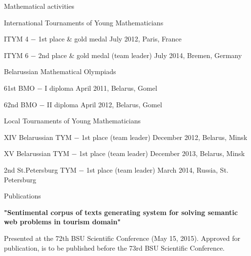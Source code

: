 \documentclass{resume} %
\begin{document}

\begin{rSection}{Mathematical activities}

\begin{rSubsection}{International Tournaments of Young Mathematicians}{}{}

\item ITYM 4 $-$ 1st place \& gold medal \hfill July 2012, Paris, France
\item ITYM 6 $-$ 2nd place \& gold medal (team leader) \hfill July 2014, Bremen, Germany

\end{rSubsection}

\begin{rSubsection}{Belarussian Mathematical Olympiads}{}{}

\item 61st BMO $-$ I diploma \hfill  April 2011, Belarus, Gomel
\item 62nd BMO $-$ II diploma \hfill April 2012, Belarus, Gomel
\end{rSubsection}


\begin{rSubsection}{Local Tournaments of Young Mathematicians}{}{}

\item XIV Belarussian TYM $-$ 1st place (team leader) \hfill December 2012, Belarus, Minsk
\item XV Belarussian TYM $-$ 1st place (team leader) \hfill December 2013, Belarus, Minsk
\item 2nd St.Petersburg TYM $-$ 1st place (team leader) \hfill March 2014, Russia, St. Petersburg
\end{rSubsection}

\end{rSection}

\begin{rSection}{Publications}

{\bf "Sentimental corpus of texts generating system for solving semantic web problems in tourism domain"}

Presented at the 72th BSU Scientific Conference (May 15, 2015). Approved for publication, is to be published before the 73rd BSU Scientific Conference.

\end{rSection}






\end{document}
